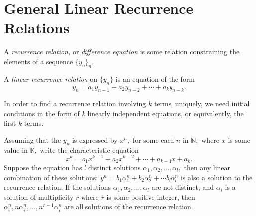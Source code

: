 
\section{General Linear Recurrence Relations}

\begin{definition}
	A \emph{recurrence relation,} or \emph{difference equation} is some relation constraining the elements of a sequence $\{ y_n \}_n.$
\end{definition}

A \emph{linear recurrence relation} on $\{ y_n \}$ is an equation
of the form 
$$ y_n = a_1 y_{n-1} + a_2 y_{n-2} + \cdots + a_k y_{n-k}.$$

\begin{remark}
	In order to find a recurrence relation involving $k$ terms, uniquely, we need
	initial conditions in the form of $k$ linearly independent
	equations, or equivalently, the first $k$ terms.
\end{remark}

Assuming that the $y_n$ is expressed by $x^n,$ for some each $n$ in 
$\mathbb{N},$ where $x$ is some value in $\mathbb{K},$
write the characteristic equation 
$$x^k = a_1 x^{k-1} + a_2 x^{k-2} + \cdots + a_{k-1} x + a_k.$$
Suppose the equation has $l$ distinct solutions $\alpha_1, \alpha_2,
\dotsc, \alpha_l,$ then any linear combination of these solutions:
$y^n = b_1 \alpha_1^n + b_2 \alpha_2^n + \cdots b_l \alpha_l^n$ is 
also a solution to the recurrence relation.
If the solutions $\alpha_1, \alpha_2, \dotsc, \alpha_l$ are not
distinct, and $\alpha_i$ is a solution of multiplicity $r$ where 
$r$ is some positive integer, then $\alpha_i^n, n \alpha_i^n, \dotsc,
n^{r-1} \alpha_i^n$ are all solutions of the recurrence relation.

